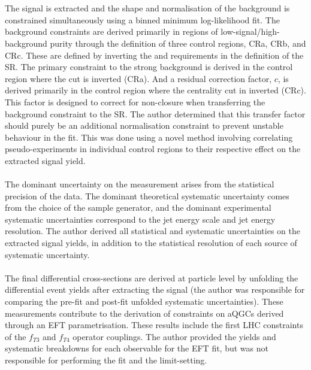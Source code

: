 \documentclass{thesissummary}
\begin{document}
\\\\
The signal is extracted and the shape and normalisation of the background is constrained simultaneously using a binned minimum log-likelihood fit. The background constraints are derived primarily in regions of low-signal/high-background purity through the definition of three control regions, CRa, CRb, and CRc. These are defined by inverting the \xily and \ngapjet requirements in the definition of the SR. The primary constraint to the strong background is derived in the control region where the \ngapjet cut is inverted (CRa). And a residual correction factor, $c$, is derived primarily in the control region where the centrality cut in inverted (CRc). This factor is designed to correct for non-closure when transferring the background constraint to the SR. The author determined that this transfer factor should purely be an additional normalisation constraint to prevent unstable behaviour in the fit. This was done using a novel method involving correlating pseudo-experiments in individual control regions to their respective effect on the extracted signal yield.
\\\\
The dominant uncertainty on the measurement arises from the statistical precision of the data. The dominant theoretical systematic uncertainty comes from the choice of the \qcdwy sample generator, and the dominant experimental systematic uncertainties correspond to the jet energy scale and jet energy resolution. The author derived all statistical and systematic uncertainties on the extracted signal yields, in addition to the statistical resolution of each source of systematic uncertainty.
\\\\
The final differential cross-sections are derived at particle level by unfolding the differential event yields after extracting the \ewwy signal (the author was responsible for comparing the pre-fit and post-fit unfolded systematic uncertainties). These measurements contribute to the derivation of constraints on aQGCs derived through an EFT parametrisation. These results include the first LHC constraints of the $f_{T3}$ and $f_{T4}$ operator couplings. The author provided the yields and systematic breakdowns for each observable for the EFT fit, but was not responsible for performing the fit and the limit-setting.
\end{document}
